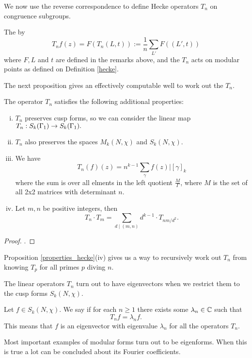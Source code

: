 \documentclass[12pt, a4paper]{amsart}
\begin{document}
We now use the reverse correspondence to define Hecke operators $T_n$ on
congruence subgroups.

\begin{defn}
  The  by
  \[T_nf(z) = F(T_n(L,t)) := \frac{1}{n} \sum\limits_{L'} F((L',t))\]
  where $F, L$ and $t$ are defined in the remarks above, and the $T_n$ acts on
  modular points as defined on Definition \ref{hecke}.
\end{defn}

The next proposition gives an effectively computable well to work out the $T_n$. 

\begin{prop} \label{properties_hecke}
The operator $T_n$ satisfies the following additional properties:
  \begin{enumerate}[(i)]
  \item $T_n$ preserves cusp forms, so we can consider the linear map $T_n :
    S_k(\Gamma_1) \rightarrow S_k(\Gamma_1).$ 
  \item $T_n$ also preserves the spaces $M_k(N, \chi)$ and $S_k(N, \chi).$
  \item We have
    \[T_n(f)(z) = n^{k-1} \sum\limits_\gamma f(z) | [\gamma]_k \]
    where the sum is over all elments in the left quotient $\frac{M}{\Gamma}$,
    where $M$ is the set of all 2x2 matrices with determinant $n$.
  \item Let $m, n$ be positive integers, then
    \[T_n \cdot T_m = \sum\limits_{d \mid (m,n)} d^{k-1} \cdot T_{nm/d^2}.\]
  \end{enumerate}
\end{prop}
\begin{proof}
  \cite[Section 4.1.2, Pages 61-64]{modular}.
\end{proof}
Proposition \autoref{properties_hecke}(iv) gives us a way to recursively work out
$T_n$ from knowing $T_p$ for all primes $p$ diving $n$.

The linear operators $T_n$ turn out to have eigenvectors when we restrict them
to the cusp forms $S_k(N, \chi).$

\begin{defn}
  Let $f \in S_k(N, \chi).$ We say  if for each $n
  \geq 1$ there exists some $\lambda_n \in {\mathbb C}$ such that
  \[T_n f = \lambda_n f.\]
  This means that $f$ is an eigenvector with eigenvalue $\lambda_n$ for all the
  operators $T_n.$
\end{defn}

Most important examples of modular forms turn out to be eigenforms. When this is
true a lot can be concluded about its Fourier coefficients. 
\end{document}

